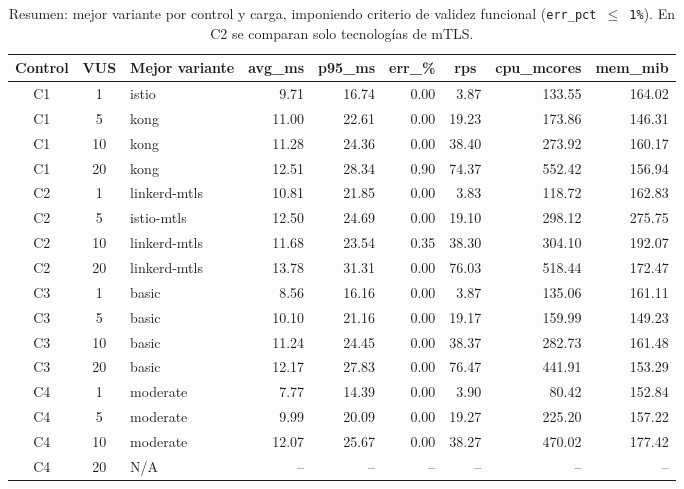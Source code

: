 \begin{table}[htbp]
\centering
\small
\begin{tabular}{c c l r r r r r r}
\hline
Control & VUS & Mejor variante & \multicolumn{1}{c}{avg\_ms} & \multicolumn{1}{c}{p95\_ms} & \multicolumn{1}{c}{err\_\%} & \multicolumn{1}{c}{rps} & \multicolumn{1}{c}{cpu\_mcores} & \multicolumn{1}{c}{mem\_mib} \\
\hline
C1 & 1  & istio        & 9.71  & 16.74 & 0.00 & 3.87  & 133.55 & 164.02 \\
C1 & 5  & kong         & 11.00 & 22.61 & 0.00 & 19.23 & 173.86 & 146.31 \\
C1 & 10 & kong         & 11.28 & 24.36 & 0.00 & 38.40 & 273.92 & 160.17 \\
C1 & 20 & kong         & 12.51 & 28.34 & 0.90 & 74.37 & 552.42 & 156.94 \\
C2 & 1  & linkerd-mtls & 10.81 & 21.85 & 0.00 & 3.83  & 118.72 & 162.83 \\
C2 & 5  & istio-mtls   & 12.50 & 24.69 & 0.00 & 19.10 & 298.12 & 275.75 \\
C2 & 10 & linkerd-mtls & 11.68 & 23.54 & 0.35 & 38.30 & 304.10 & 192.07 \\
C2 & 20 & linkerd-mtls & 13.78 & 31.31 & 0.00 & 76.03 & 518.44 & 172.47 \\
C3 & 1  & basic        & 8.56  & 16.16 & 0.00 & 3.87  & 135.06 & 161.11 \\
C3 & 5  & basic        & 10.10 & 21.16 & 0.00 & 19.17 & 159.99 & 149.23 \\
C3 & 10 & basic        & 11.24 & 24.45 & 0.00 & 38.37 & 282.73 & 161.48 \\
C3 & 20 & basic        & 12.17 & 27.83 & 0.00 & 76.47 & 441.91 & 153.29 \\
C4 & 1  & moderate     & 7.77  & 14.39 & 0.00 & 3.90  & 80.42  & 152.84 \\
C4 & 5  & moderate     & 9.99  & 20.09 & 0.00 & 19.27 & 225.20 & 157.22 \\
C4 & 10 & moderate     & 12.07 & 25.67 & 0.00 & 38.27 & 470.02 & 177.42 \\
C4 & 20 & N/A          & --    & --    & --   & --    & --     & -- \\
\hline
\end{tabular}
\caption{Resumen: mejor variante por control y carga, imponiendo criterio de validez funcional (\texttt{err\_pct $\leq$ 1\%}). En C2 se comparan solo tecnologías de mTLS.}
\end{table}

